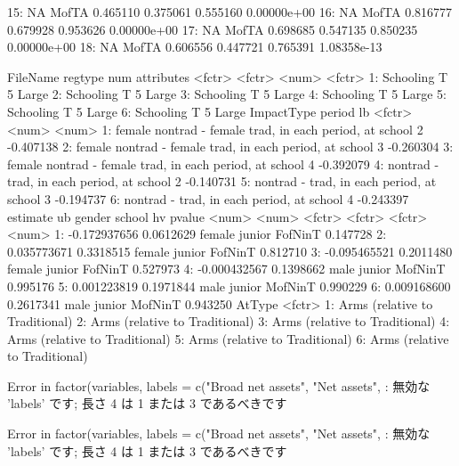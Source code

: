 \begin{Schunk}
\begin{Soutput}
15:     NA  MofTA 0.465110 0.375061 0.555160 0.00000e+00
16:     NA  MofTA 0.816777 0.679928 0.953626 0.00000e+00
17:     NA  MofTA 0.698685 0.547135 0.850235 0.00000e+00
18:     NA  MofTA 0.606556 0.447721 0.765391 1.08358e-13
\end{Soutput}
\begin{Soutput}
    FileName regtype   num attributes
      <fctr>  <fctr> <num>     <fctr>
1: Schooling       T     5      Large
2: Schooling       T     5      Large
3: Schooling       T     5      Large
4: Schooling       T     5      Large
5: Schooling       T     5      Large
6: Schooling       T     5      Large
                                                ImpactType period        lb
                                                    <fctr>  <num>     <num>
1: female nontrad - female trad, in each period, at school      2 -0.407138
2: female nontrad - female trad, in each period, at school      3 -0.260304
3: female nontrad - female trad, in each period, at school      4 -0.392079
4:               nontrad - trad, in each period, at school      2 -0.140731
5:               nontrad - trad, in each period, at school      3 -0.194737
6:               nontrad - trad, in each period, at school      4 -0.243397
       estimate        ub gender school      hv   pvalue
          <num>     <num> <fctr> <fctr>  <fctr>    <num>
1: -0.172937656 0.0612629 female junior FofNinT 0.147728
2:  0.035773671 0.3318515 female junior FofNinT 0.812710
3: -0.095465521 0.2011480 female junior FofNinT 0.527973
4: -0.000432567 0.1398662   male junior MofNinT 0.995176
5:  0.001223819 0.1971844   male junior MofNinT 0.990229
6:  0.009168600 0.2617341   male junior MofNinT 0.943250
                           AtType
                           <fctr>
1: Arms (relative to Traditional)
2: Arms (relative to Traditional)
3: Arms (relative to Traditional)
4: Arms (relative to Traditional)
5: Arms (relative to Traditional)
6: Arms (relative to Traditional)
\end{Soutput}
\end{Schunk}


\begin{Schunk}
\begin{Soutput}
Error in factor(variables, labels = c("Broad net assets", "Net assets", : 無効な 'labels' です; 長さ 4 は 1 または 3 であるべきです
\end{Soutput}
\end{Schunk}
\begin{Schunk}
\begin{Soutput}
Error in factor(variables, labels = c("Broad net assets", "Net assets", : 無効な 'labels' です; 長さ 4 は 1 または 3 であるべきです
\end{Soutput}
\end{Schunk}


